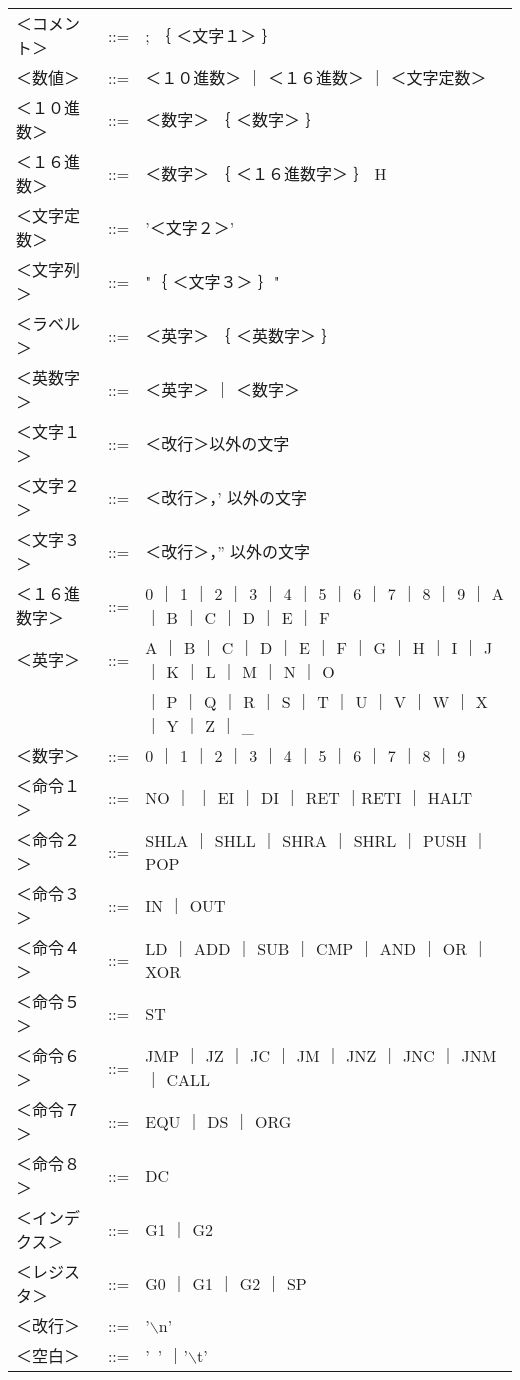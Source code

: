\begin{center}
{\begin{tabular}{lll}
＜コメント＞  & ::= &; ｛ ＜文字１＞ ｝ \\
＜数値＞      & ::= &＜１０進数＞ ｜ ＜１６進数＞ ｜ ＜文字定数＞ \\
＜１０進数＞  & ::= &＜数字＞ ｛ ＜数字＞ ｝ \\
＜１６進数＞  & ::= &＜数字＞ ｛ ＜１６進数字＞ ｝ H \\
＜文字定数＞  & ::= &'＜文字２＞' \\
＜文字列＞    & ::= &"｛ ＜文字３＞ ｝" \\
＜ラベル＞    & ::= &＜英字＞ ｛ ＜英数字＞ ｝ \\
＜英数字＞    & ::= &＜英字＞ ｜ ＜数字＞ \\
＜文字１＞    & ::= &＜改行＞以外の文字 \\
＜文字２＞    & ::= &＜改行＞，' 以外の文字 \\
＜文字３＞    & ::= &＜改行＞，” 以外の文字 \\
＜１６進数字＞& ::= &0 ｜ 1 ｜ 2 ｜ 3 ｜ 4 ｜ 5 ｜ 6 ｜ 7 ｜ 8 ｜ 9 
                       ｜ A ｜ B ｜ C ｜ D ｜ E ｜ F \\
＜英字＞      & ::= &A ｜ B ｜ C ｜ D ｜ E ｜ F ｜ G ｜ H ｜ I ｜ J 
                       ｜ K ｜ L ｜ M ｜ N ｜ O \\
              &     &  ｜ P ｜ Q ｜ R ｜ S ｜ T ｜ U ｜ V ｜ W ｜ X
                       ｜ Y ｜ Z ｜ \_ \\
＜数字＞      & ::= &0 ｜ 1 ｜ 2 ｜ 3 ｜ 4 ｜ 5 ｜ 6 ｜ 7 ｜ 8 ｜ 9 \\
＜命令１＞    & ::= &NO ｜ ｜ EI ｜ DI ｜ RET ｜RETI ｜ HALT \\
＜命令２＞    & ::= &SHLA ｜ SHLL ｜ SHRA ｜ SHRL ｜ PUSH ｜ POP \\
＜命令３＞    & ::= &IN ｜ OUT \\
＜命令４＞    & ::= &LD ｜ ADD ｜ SUB ｜ CMP ｜ AND ｜ OR ｜XOR \\
＜命令５＞    & ::= &ST \\
＜命令６＞    & ::= &JMP ｜ JZ ｜ JC ｜ JM ｜ JNZ ｜ JNC ｜ JNM ｜ CALL \\
＜命令７＞    & ::= &EQU ｜ DS ｜ ORG \\
＜命令８＞    & ::= &DC \\
＜インデクス＞& ::= &G1 ｜ G2 \\
＜レジスタ＞  & ::= &G0 ｜ G1 ｜ G2 ｜ SP \\
＜改行＞      & ::= &'$\backslash$n' \\
＜空白＞      & ::= &'~' ｜'$\backslash$t' \\
\end{tabular}}
\end{center}

